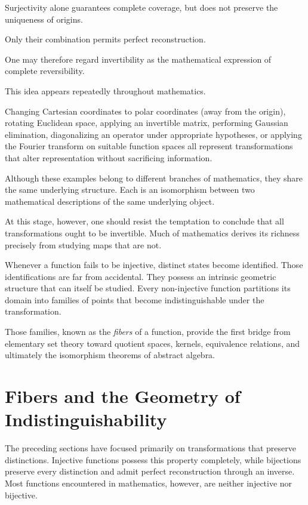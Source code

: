 \documentclass[11pt]{book}
\numberwithin{equation}{chapter}
\theoremstyle{definition}
\theoremstyle{plain}
\theoremstyle{remark}
\begin{document}
Surjectivity alone guarantees complete coverage, but does not preserve the uniqueness of origins.

Only their combination permits perfect reconstruction.

One may therefore regard invertibility as the mathematical expression of complete reversibility.

This idea appears repeatedly throughout mathematics.

Changing Cartesian coordinates to polar coordinates (away from the origin), rotating Euclidean space, applying an invertible matrix, performing Gaussian elimination, diagonalizing an operator under appropriate hypotheses, or applying the Fourier transform on suitable function spaces all represent transformations that alter representation without sacrificing information.

Although these examples belong to different branches of mathematics, they share the same underlying structure. Each is an isomorphism between two mathematical descriptions of the same underlying object.

At this stage, however, one should resist the temptation to conclude that all transformations ought to be invertible. Much of mathematics derives its richness precisely from studying maps that are not.

Whenever a function fails to be injective, distinct states become identified. Those identifications are far from accidental. They possess an intrinsic geometric structure that can itself be studied. Every non-injective function partitions its domain into families of points that become indistinguishable under the transformation.

Those families, known as the \emph{fibers} of a function, provide the first bridge from elementary set theory toward quotient spaces, kernels, equivalence relations, and ultimately the isomorphism theorems of abstract algebra.


\section{Fibers and the Geometry of Indistinguishability}

The preceding sections have focused primarily on transformations that preserve distinctions. Injective functions possess this property completely, while bijections preserve every distinction and admit perfect reconstruction through an inverse. Most functions encountered in mathematics, however, are neither injective nor bijective.
\end{document}
